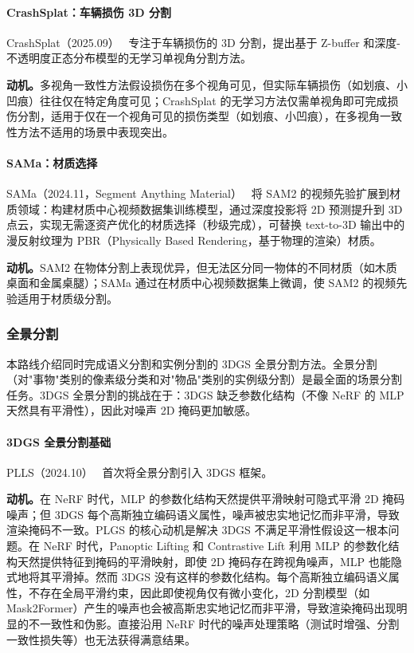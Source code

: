 \paragraph{CrashSplat：车辆损伤 3D 分割} CrashSplat（2025.09）~\cite{2509_23947} 专注于车辆损伤的 3D 分割，提出基于 Z-buffer 和深度-不透明度正态分布模型的无学习单视角分割方法。

\textbf{动机。}多视角一致性方法假设损伤在多个视角可见，但实际车辆损伤（如划痕、小凹痕）往往仅在特定角度可见；CrashSplat 的无学习方法仅需单视角即可完成损伤分割，适用于仅在一个视角可见的损伤类型（如划痕、小凹痕），在多视角一致性方法不适用的场景中表现突出。

\paragraph{SAMa：材质选择} SAMa（2024.11，Segment Anything Material）~\cite{2411_19322} 将 SAM2 的视频先验扩展到材质领域：构建材质中心视频数据集训练模型，通过深度投影将 2D 预测提升到 3D 点云，实现无需逐资产优化的材质选择（秒级完成），可替换 text-to-3D 输出中的漫反射纹理为 PBR（Physically Based Rendering，基于物理的渲染）材质。

\textbf{动机。}SAM2 在物体分割上表现优异，但无法区分同一物体的不同材质（如木质桌面和金属桌腿）；SAMa 通过在材质中心视频数据集上微调，使 SAM2 的视频先验适用于材质级分割。

\subsubsection{全景分割}

本路线介绍同时完成语义分割和实例分割的 3DGS 全景分割方法。全景分割（对"事物"类别的像素级分类和对"物品"类别的实例级分割）是最全面的场景分割任务。3DGS 全景分割的挑战在于：3DGS 缺乏参数化结构（不像 NeRF 的 MLP 天然具有平滑性），因此对噪声 2D 掩码更加敏感。

\paragraph{3DGS 全景分割基础} PLLS（2024.10）~\cite{2410_17505} 首次将全景分割引入 3DGS 框架。

\textbf{动机。}在 NeRF 时代，MLP 的参数化结构天然提供平滑映射可隐式平滑 2D 掩码噪声；但 3DGS 每个高斯独立编码语义属性，噪声被忠实地记忆而非平滑，导致渲染掩码不一致。PLGS 的核心动机是解决 3DGS 不满足平滑性假设这一根本问题。在 NeRF 时代，Panoptic Lifting 和 Contrastive Lift 利用 MLP 的参数化结构天然提供特征到掩码的平滑映射，即使 2D 掩码存在跨视角噪声，MLP 也能隐式地将其平滑掉。然而 3DGS 没有这样的参数化结构。每个高斯独立编码语义属性，不存在全局平滑约束，因此即使视角仅有微小变化，2D 分割模型（如 Mask2Former）产生的噪声也会被高斯忠实地记忆而非平滑，导致渲染掩码出现明显的不一致性和伪影。直接沿用 NeRF 时代的噪声处理策略（测试时增强、分割一致性损失等）也无法获得满意结果。

